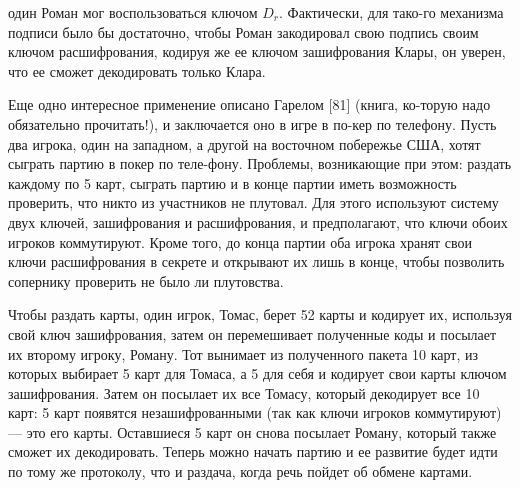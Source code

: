 один Роман мог воспользоваться ключом $D_r$. Фактически, для 
тако-\linebreak го механизма подписи было бы достаточно, чтобы Роман закодировал
свою подпись своим ключом расшифрования, кодируя же ее ключом
зашифрования Клары, он уверен, что ее сможет декодировать только\linebreak
Клара.\par
 Еще одно интересное применение описано Гарелом [81] (книга, 
ко-\linebreak торую надо обязательно прочитать!), и заключается оно в игре в 
по-\linebreak кер по телефону. Пусть два игрока, один на западном, а другой на\linebreak
восточном побережье США, хотят сыграть партию в покер по теле-\linebreak фону. Проблемы, возникающие при этом: раздать каждому по 5 карт,\linebreak
сыграть партию и в конце партии иметь возможность проверить, что\linebreak
никто из участников не плутовал. Для этого используют систему двух\linebreak
ключей, зашифрования и расшифрования, и предполагают, что ключи\linebreak
обоих игроков коммутируют. Кроме того, до конца партии оба игрока\linebreak
хранят свои ключи расшифрования в секрете и открывают их лишь в\linebreak
конце, чтобы позволить сопернику проверить не было ли плутовства.

\newpage

Чтобы раздать карты, один игрок, Томас, берет 52 карты и 
кодирует их, используя свой ключ зашифрования, затем он перемешивает
полученные коды и посылает их второму игроку, Роману. Тот 
вынимает из полученного пакета 10 карт, из которых выбирает 5 карт для
Томаса, а 5 для себя и кодирует свои карты ключом зашифрования.
Затем он посылает их все Томасу, который декодирует все 10 карт: 5
карт появятся незашифрованными (так как ключи игроков 
коммутируют) --- это его карты. Оставшиеся 5 карт он снова посылает Роману,
который также сможет их декодировать. Теперь можно начать партию
и ее развитие будет идти по тому же протоколу, что и раздача, когда
речь пойдет об обмене картами.\\
\subsectiontop
